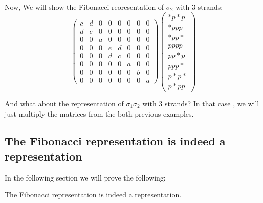 \documentclass{article}
\begin{document}
Now, We will show the Fibonacci reoresentation of $\sigma_{2}$ with 3 strands:
\[
\begin{pmatrix} c & d & 0 & 0 & 0 & 0 & 0 & 0 \\ d & e & 0 & 0 & 0 & 0 & 0 & 0 \\ 0 & 0 & a & 0 & 0 & 0 & 0 & 0 \\ 0 & 0 & 0 & e & d & 0 & 0 & 0 \\ 0 & 0 & 0 & d & c & 0 & 0 & 0 \\ 0 & 0 & 0 & 0 & 0 & a & 0 & 0 \\0 & 0 & 0 & 0 & 0 & 0 & b & 0 \\0 & 0 & 0 & 0 & 0 & 0 & 0 & a \end{pmatrix} 
  \begin{pmatrix} *p*p \\ *ppp \\ *pp* \\ pppp \\ pp*p \\ ppp* \\ p*p* \\ p*pp \end{pmatrix}
\]

And what about the representation of $\sigma_{1}\sigma_{2}$ with 3 strands? In that case , we will just multiply the matrices from the both previous examples.

\subsection{The Fibonacci representation is indeed a representation}
In the following section we will prove the following:
\begin{theorem}
The Fibonacci representation is indeed a representation. 
\end{theorem}
\end{document}

